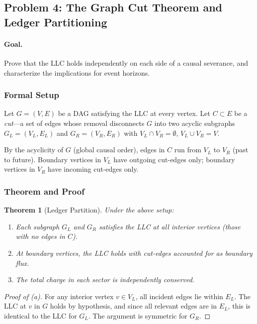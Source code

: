 \documentclass[11pt,a4paper]{article}
\theoremstyle{plain}
\newtheorem{theorem}{Theorem}[section]
\theoremstyle{definition}
\theoremstyle{remark}
\begin{document}
\subsection{Problem 4: The Graph Cut Theorem and Ledger Partitioning}

\paragraph{Goal.} Prove that the LLC holds independently on each side of a causal
severance, and characterize the implications for event horizons.

\subsubsection{Formal Setup}

Let $G = (V, E)$ be a DAG satisfying the LLC at every vertex. Let $C \subset E$ be
a \emph{cut}---a set of edges whose removal disconnects $G$ into two acyclic
subgraphs $G_{L} = (V_{L}, E_{L})$ and $G_{R} = (V_{R}, E_{R})$ with $V_{L} \cap
V_{R} = \emptyset$, $V_{L} \cup V_{R} = V$.

By the acyclicity of $G$ (global causal order), edges in $C$ run from $V_{L}$ to
$V_{R}$ (past to future). Boundary vertices in $V_{L}$ have outgoing cut-edges
only; boundary vertices in $V_{R}$ have incoming cut-edges only.

\subsubsection{Theorem and Proof}

\begin{theorem}[Ledger Partition]
\label{thm:cut}
Under the above setup:
\begin{enumerate}[label=\emph{(\alph*)}]
  \item Each subgraph $G_{L}$ and $G_{R}$ satisfies the LLC at all interior
  vertices (those with no edges in $C$).
  \item At boundary vertices, the LLC holds with cut-edges accounted for as
  boundary flux.
  \item The total charge in each sector is independently conserved.
\end{enumerate}
\end{theorem}

\begin{proof}[Proof of (a)]
For any interior vertex $v \in V_{L}$, all incident edges lie within $E_{L}$. The
LLC at $v$ in $G$ holds by hypothesis, and since all relevant edges are in $E_{L}$,
this is identical to the LLC for $G_{L}$. The argument is symmetric for $G_{R}$.
\end{proof}
\end{document}
